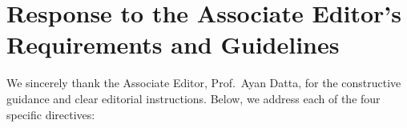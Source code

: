 \documentclass[11pt, sans, a4paper]{moderncv}
\begin{document}
\newpage


\section*{Response to the Associate Editor's Requirements and Guidelines}

We sincerely thank the Associate Editor, Prof.~Ayan Datta, for the constructive guidance and clear editorial instructions. Below, we address each of the four specific directives:
\end{document}
